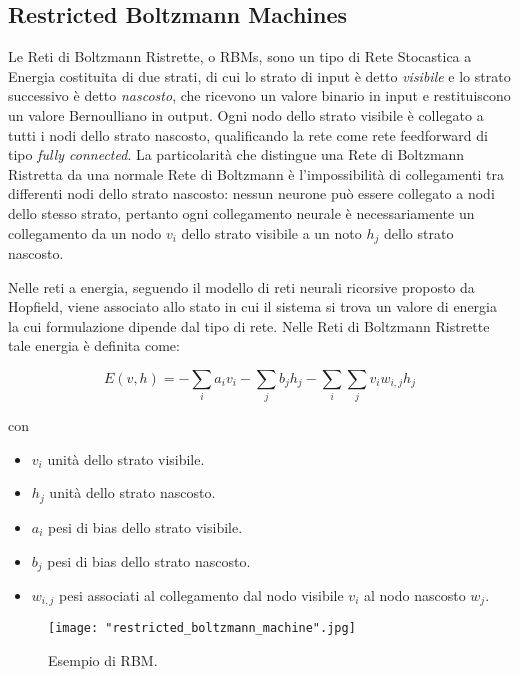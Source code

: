 \documentclass[10pt,letterpaper]{article}
\begin{document}
\subsection{Restricted Boltzmann Machines}
Le Reti di Boltzmann Ristrette, o RBMs, sono un tipo di Rete Stocastica a Energia costituita di due strati, di cui lo strato di input è detto \textit{visibile} e lo strato successivo è detto \textit{nascosto}, che ricevono un valore binario in input e restituiscono un valore Bernoulliano in output. Ogni nodo dello strato visibile è collegato a tutti i nodi dello strato nascosto, qualificando la rete come rete feedforward di tipo \textit{fully connected}. La particolarità che distingue una Rete di Boltzmann Ristretta da una normale Rete di Boltzmann è l'impossibilità di collegamenti tra differenti nodi dello strato nascosto: nessun neurone può essere collegato a nodi dello stesso strato, pertanto ogni collegamento neurale è necessariamente un collegamento da un nodo $v_i$ dello strato visibile a un noto $h_j$ dello strato nascosto. 

\newpage
Nelle reti a energia, seguendo il modello di reti neurali ricorsive proposto da Hopfield, viene associato allo stato in cui il sistema si trova un valore di energia la cui formulazione dipende dal tipo di rete. Nelle Reti di Boltzmann Ristrette tale energia è definita come:

\begin{equation}
E(v,h) = -\sum_{i}a_i v_i - \sum_{j}b_j h_j - \sum_{i}\sum_{j}v_i w_{i,j} h_j
\end{equation}

con

\begin{itemize}
\item $v_i$ unità dello strato visibile.
\item $h_j$ unità dello strato nascosto.
\item $a_i$ pesi di bias dello strato visibile.
\item $b_j$ pesi di bias dello strato nascosto.
\item $w_{i,j}$ pesi associati al collegamento dal nodo visibile $v_i$ al nodo nascosto $w_j$.
\end{itemize}

\begin{figure}[h!]
	\centering
	\texttt{[image: "restricted\_boltzmann\_machine".jpg]}
	\caption{Esempio di RBM.}
	\label{fig:screen2}
\end{figure}
\end{document}
